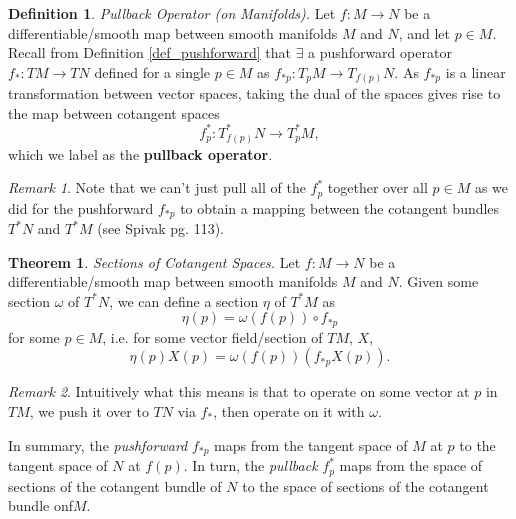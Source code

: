 \documentclass[10pt,landscape]{article}
\theoremstyle{definition}
\newtheorem{definition}{Definition}[section]
\theoremstyle{theorem}
\newtheorem{theorem}{Theorem}[section]
\theoremstyle{summary}
\theoremstyle{remark}
\newtheorem*{remark}{Remark}
\begin{document}
\begin{multicols*}{3}
\theoremstyle{definition}
\begin{definition}{\textit{Pullback Operator (on Manifolds).}}
    Let $f:M\rightarrow N$ be a differentiable/smooth map between smooth manifolds $M$ and $N$, and let $p\in M$. Recall from Definition \ref{def_pushforward} that $\exists$ a pushforward operator $f_*:TM\rightarrow TN$ defined for a single $p\in M$ as $f_{*p} : T_pM\rightarrow T_{f(p)}N$. As $f_{*p}$ is a linear transformation between vector spaces, taking the dual of the spaces gives rise to the map between cotangent spaces
    \begin{equation}
        f_p^* : T_{f(p)}^* N\rightarrow T_p^*M,
    \end{equation}
    which we label as the \textbf{pullback operator}.
\end{definition}

\begin{remark}
    Note that we can't just pull all of the $f_p^*$ together over all $p\in M$ as we did for the pushforward $f_{*p}$ to obtain a mapping between the cotangent bundles $T^*N$ and $T^*M$ (see Spivak pg. 113).
\end{remark}

\theoremstyle{theorem}
\begin{theorem}{\textit{Sections of Cotangent Spaces.}}
    Let $f:M\rightarrow N$ be a differentiable/smooth map between smooth manifolds $M$ and $N$. Given some section $\omega$ of $T^*N$, we can define a section $\eta$ of $T^*M$ as
    \begin{equation}
        \eta(p) = \omega (f(p)) \circ f_{*p}
    \end{equation}
    for some $p\in M$, i.e. for some vector field/section of $TM$, $X$,
    \begin{equation}
        \eta(p)X(p) = \omega(f(p))(f_{*p}X(p)).
    \end{equation}
\end{theorem}

\begin{remark}
    Intuitively what this means is that to operate on some vector at $p$ in $TM$, we push it over to $TN$ via $f_*$, then operate on it with $\omega$. 
    
    In summary, the \textit{pushforward} $f_{*p}$ maps from the tangent space of $M$ at $p$ to the tangent space of $N$ at $f(p)$. In turn, the \textit{pullback} $f_p^*$ maps from the space of sections of the cotangent bundle of $N$ to the space of sections of the cotangent bundle onf$M$.
\end{remark}


\end{multicols*}
\end{document}

